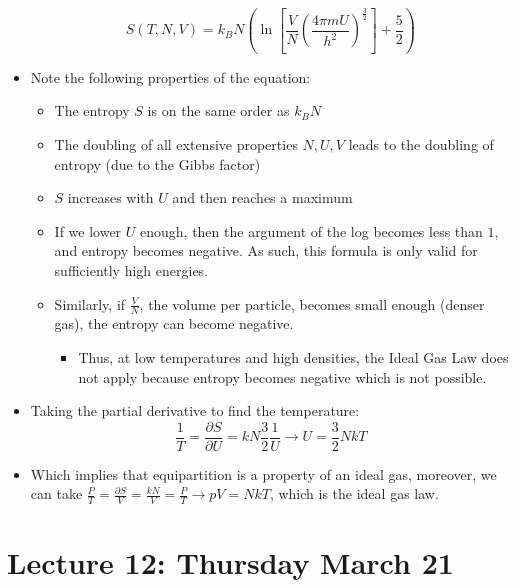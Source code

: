 \documentclass[8pt]{article}
\begin{document}
\begin{itemize}
    \begin{equation}
       S(T, N, V) =  k_B N\left( \ln \left[ \frac{V}{N} \left( \frac{4 \pi m U}{h^2} \right)^{\frac{3}{2}} \right] + \frac{5}{2} \right)
    \end{equation}
    \item Note the following properties of the equation: 
    \begin{itemize}
        \item The entropy $S$ is on the same order as $k_B N$ 
        \item The doubling of all extensive properties $N, U, V$ leads to the doubling of entropy (due to the Gibbs factor)
        \item $S$ increases with $U$ and then reaches a maximum 
        \item If we lower $U$ enough, then the argument of the log becomes less than $1$, and entropy becomes negative. As such, this formula is only valid for sufficiently high energies. 
        \item Similarly, if $\frac{V}{N}$, the volume per particle, becomes small enough (denser gas), the entropy can become negative. 
        \begin{itemize}
            \item Thus, at low temperatures and high densities, the Ideal Gas Law does not apply because entropy becomes negative which is not possible.
        \end{itemize}
    \end{itemize}
    \item Taking the partial derivative to find the temperature: \[\frac{1}{T} = \frac{\partial S}{\partial U} = kN \frac{3}{2} \frac{1}{U} \rightarrow U = \frac{3}{2}NkT\]
    \item Which implies that equipartition is a property of an ideal gas, moreover, we can take $ \frac{P}{T} = \frac{\partial S}{V} = \frac{kN}{V} = \frac{P}{T} \rightarrow pV = NkT$, which is the ideal gas law. 
\end{itemize}


\section{Lecture 12: Thursday March 21}
\end{document}
